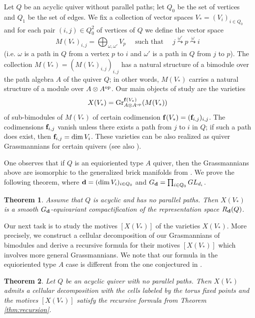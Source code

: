\documentclass[12pt,a4paper]{amsart}
\newtheorem{theoremA}{Theorem}
\numberwithin{equation}{section}
\theoremstyle{remark}
\begin{document}
Let $Q$ be an acyclic quiver without parallel paths; let $Q_0$ be the set of vertices and 
$Q_1$ be the set of edges. We fix a collection of vector spaces $V_*=(V_i)_{i\in Q_0}$ 
and for each pair
$(i,j)\in Q_0^2$ of vertices of $Q$ we define the vector space
\[
M(V_*)_{i,j} = \bigoplus_{\omega,\omega'} V_p\quad \text{ such that }\quad
j\stackrel{\omega'}{\leadsto}p\stackrel{\omega}{\leadsto}i
\]
(i.e. $\omega$ is a path in $Q$ from a vertex $p$ to $i$ and $\omega'$ is a path in $Q$ from $j$ to $p$).
The collection $M(V_*)=(M(V_*)_{i,j})_{i,j}$ has a natural structure of a bimodule
over the path algebra $A$ of the quiver $Q$; in other words, $M(V_*)$ carries a natural structure
of a module over $A\otimes A^{\rm op}$. Our main objects of study are the varieties
$$X(V_*) = {\rm Gr}^{{\bf f}(V_*)}_{A\otimes A^{\rm op}}(M(V_*))$$
of sub-bimodules of $M(V_*)$ of certain codimension  ${\bf f}(V_*)=({\bf f}_{i,j})_{i,j}$.
The codimensions ${\bf f}_{i,j}$ vanish unless there exists a path from $j$ to $i$ in $Q$;
if such a path does exist, then ${\bf f}_{i,j}=\dim V_i$. These varieties can be also 
realized as quiver Grassmannians for certain quivers (see also \cite{CFR12,CR08,CI20}). 

One observes that if $Q$ is an equioriented type $A$ quiver, then the Grassmannians
above are isomorphic to the generalized brick manifolds from \cite{L25}. 
We prove the following theorem, where ${\bf d}=(\dim V_i)_{i\in Q_0}$ and 
$G_{\bf d}=\prod_{i\in Q_0} GL_{d_i}$.

\begin{theoremA}
Assume that $Q$ is acyclic and has no parallel paths. 
Then $X(V_*)$ is a smooth $G_{\bf d}$-equivariant 
compactification of the  representation space $R_{\bf d}(Q)$. 
\end{theoremA}

Our next task is to study the motives $[X(V_*)]$ of the varieties $X(V_*)$. More precisely,
we construct a cellular decomposition of our Grasmannians of bimodules and derive a
recursive formula for their motives $[X(V_*)]$ which involves more general Grassmannians.
We note that our formula  in the equioriented type $A$ case is different from the one
conjectured in \cite{L25}.  

\begin{theoremA}
Let $Q$ be an acyclic quiver with no parallel paths. Then $X(V_*)$ admits a cellular 
decomposition with the cells labeled
by the torus fixed points and the motives $[X(V_*)]$ satisfy the recursive formula 
from Theorem \ref{thm:recursion}.
\end{theoremA}
\end{document}

